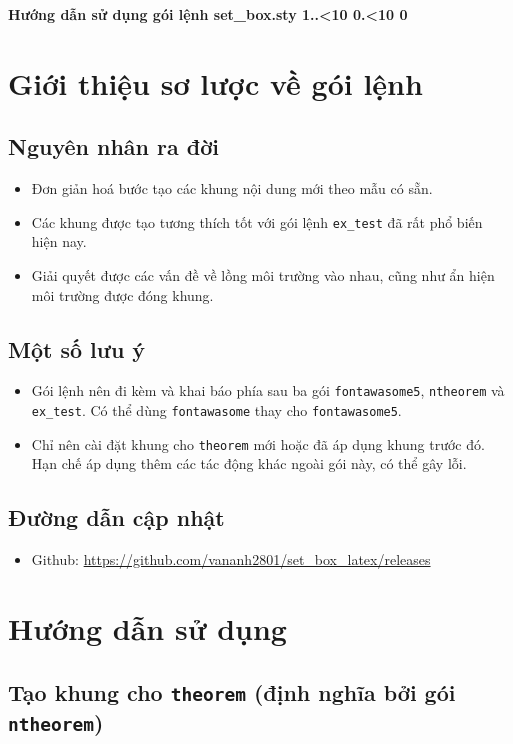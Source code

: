 \documentclass[12pt,a4paper,twoside]{article}
\newcommand{\addzero}[1]{\ifnum#1<10 0\fi#1}
\newcommand{\currentdate}{\the\year.\addzero{\the\month}.\addzero{\the\day}}
\theoremstyle{immini}
\begin{document}
	\pagestyle{plain}
	\fontsize{12pt}{16pt}\selectfont
	\begin{center}
		\Large\bf\color{red!70!black}\selectfont Hướng dẫn sử dụng gói lệnh set\_box.sty 1.\currentdate\par
	\end{center}
	\tableofcontents
	\newpage
	\section{Giới thiệu sơ lược về gói lệnh}
	\subsection{Nguyên nhân ra đời}
	\begin{itemize}
		\item Đơn giản hoá bước tạo các khung nội dung mới theo mẫu có sẵn.
		\item Các khung được tạo tương thích tốt với gói lệnh \texttt{ex\_test} đã rất phổ biến hiện nay.
		\item Giải quyết được các vấn đề về lồng môi trường vào nhau, cũng như ẩn hiện môi trường được đóng khung.
	\end{itemize}
	\subsection{Một số lưu ý}
	\begin{itemize}
		\item Gói lệnh nên đi kèm và khai báo phía sau ba gói \texttt{fontawasome5}, \texttt{ntheorem} và \texttt{ex\_test}. Có thể dùng \texttt{fontawasome} thay cho \texttt{fontawasome5}.
		\item Chỉ nên cài đặt khung cho \texttt{theorem} mới hoặc đã áp dụng khung trước đó. Hạn chế áp dụng thêm các tác động khác ngoài gói này, có thể gây lỗi.
	\end{itemize}
	\subsection{Đường dẫn cập nhật}
	\begin{itemize}
		\item Github: \url{https://github.com/vananh2801/set_box_latex/releases}
	\end{itemize}
	\newpage
	\section{Hướng dẫn sử dụng}
	\subsection{Tạo khung cho \texttt{theorem} (định nghĩa bởi gói \texttt{ntheorem})}
\end{document}
